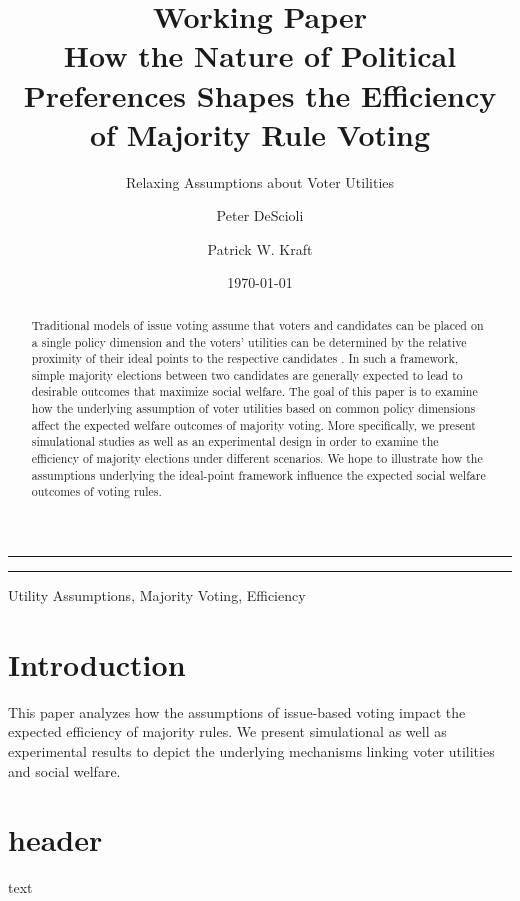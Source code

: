 \documentclass[12pt]{paper}
\author{Peter DeScioli \and Patrick W. Kraft}
\title{{\small Working Paper}\\
How the Nature of Political Preferences Shapes the Efficiency of Majority Rule Voting}
\subtitle{Relaxing Assumptions about Voter Utilities}
\date{\today}
\begin{document}
\maketitle

\hrule
\begin{abstract}%
Traditional models of issue voting assume that voters and candidates can be placed on a single policy dimension and the voters' utilities can be determined by the relative proximity of their ideal points to the respective candidates \citep[c.f.][]{downs1957economic}. In such a framework, simple majority elections between two candidates are generally expected to lead to desirable outcomes that maximize social welfare. The goal of this paper is to examine how the underlying assumption of voter utilities based on common policy dimensions affect the expected welfare outcomes of majority voting. More specifically, we present simulational studies as well as an experimental design in order to examine the efficiency of majority elections under different scenarios. We hope to illustrate how the assumptions underlying the ideal-point framework influence the expected social welfare outcomes of voting rules.
\end{abstract}
\hrule

\begin{keywords}
Utility Assumptions, Majority Voting, Efficiency
\end{keywords}

\newpage
\doublespacing

\section{Introduction}

This paper analyzes how the assumptions of issue-based voting impact the expected efficiency of majority rules. We present simulational as well as experimental results to depict the underlying mechanisms linking voter utilities and social welfare.


\section{header}

text


\clearpage



\end{document}
